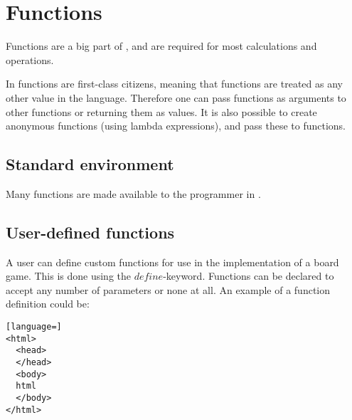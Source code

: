 \section{Functions}

Functions are a big part of \productname, and are required for most calculations and operations.

In \productname functions are first-class citizens, meaning that functions are treated
as any other value in the language. Therefore one can pass functions as
arguments to other functions or returning them as values. It is also possible to create
anonymous functions (using lambda expressions), and pass these to functions.

\subsection{Standard environment}

Many functions are made available to the programmer in \productname.

\subsection{User-defined functions}

A user can define custom functions for use in the implementation of a board game.
This is done using the $define$-keyword. Functions can be declared to accept
any number of parameters or none at all. An example of a function definition could
be:


\begin{lstlisting}[language=]
<html>
  <head>
  </head>
  <body>
  html
  </body>
</html>
\end{lstlisting}

